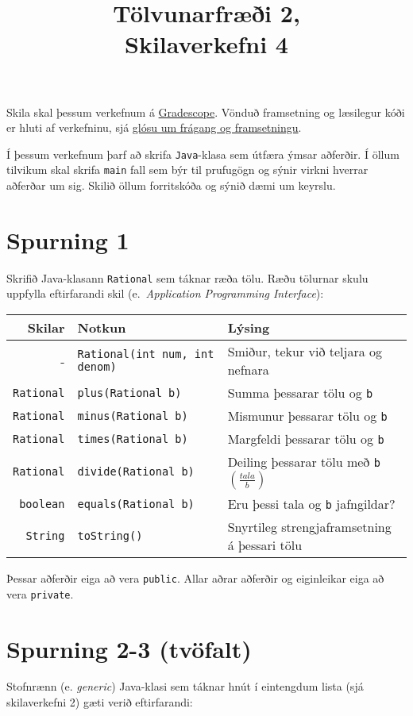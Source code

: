 \documentclass{article}
\title{Tölvunarfræði 2, \semester \\ Skilaverkefni 4}
\author{}
\begin{document}
\maketitle
{}

Skila skal þessum verkefnum á \href{https://gradescope.com/courses/5640}{Gradescope}. Vönduð framsetning og læsilegur kóði er hluti af verkefninu, sjá \href{https://piazza.com/class/ixkicfen49l111?cid=52}{glósu um frágang og framsetningu}.

Í þessum verkefnum þarf að skrifa \texttt{Java}-klasa sem útfæra ýmsar aðferðir. Í öllum tilvikum skal skrifa \texttt{main} fall sem býr til prufugögn og sýnir virkni hverrar aðferðar um sig. Skilið öllum forritskóða og sýnið dæmi um keyrslu.
\section{Spurning 1}

Skrifið Java-klasann \texttt{Rational} sem táknar ræða tölu. Ræðu tölurnar skulu uppfylla eftirfarandi skil (e.\ \emph{Application Programming Interface}):
\begin{center}
\begin{tabular}{rll}
\toprule
Skilar&Notkun&Lýsing\\
\midrule
-&\texttt{Rational(int num, int denom)}& Smiður, tekur við teljara og nefnara\\
\texttt{Rational}&\texttt{plus(Rational b)}&Summa þessarar tölu og \texttt{b}\\
\texttt{Rational}&\texttt{minus(Rational b)}&Mismunur þessarar tölu og \texttt{b}\\
\texttt{Rational}&\texttt{times(Rational b)}&Margfeldi þessarar tölu og \texttt{b}\\
\texttt{Rational}&\texttt{divide(Rational b)}&Deiling þessarar tölu með \texttt{b} $\left(\frac{tala}{b}\right)$\\
\texttt{boolean}&\texttt{equals(Rational b)}&Eru þessi tala og \texttt{b} jafngildar?\\
\texttt{String}&\texttt{toString()}&Snyrtileg strengjaframsetning á þessari tölu\\
\bottomrule
\end{tabular}
\end{center}
Þessar aðferðir eiga að vera \texttt{public}. Allar aðrar aðferðir og eiginleikar eiga að vera \texttt{private}.

\section{Spurning 2-3 (tvöfalt)}
Stofnrænn (e. \emph{generic}) Java-klasi sem táknar hnút í eintengdum lista (sjá skilaverkefni 2) gæti verið eftirfarandi:
\end{document}
